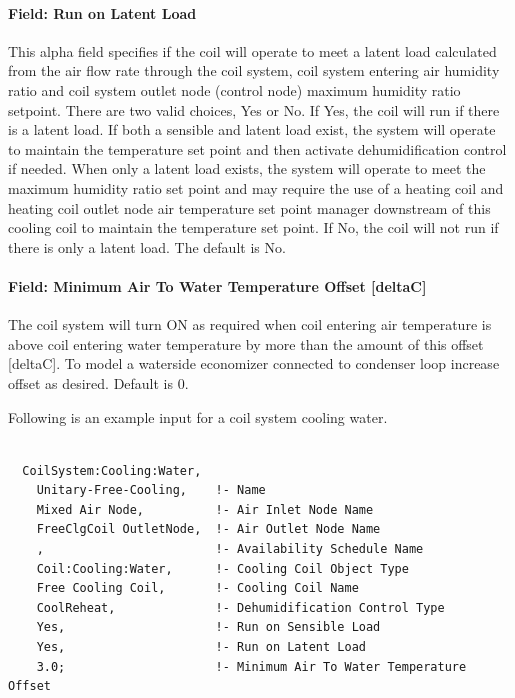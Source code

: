 \paragraph{Field: Run on Latent Load}\label{field-run-on-latent-load-01}

This alpha field specifies if the coil will operate to meet a latent load calculated from the air flow rate through the coil system, coil system entering air humidity ratio and coil system outlet node (control node) maximum humidity ratio setpoint. There are two valid choices, Yes or No. If Yes, the coil will run if there is a latent load. If both a sensible and latent load exist, the system will operate to maintain the temperature set point and then activate dehumidification control if needed. When only a latent load exists, the system will operate to meet the maximum humidity ratio set point and may require the use of a heating coil and heating coil outlet node air temperature set point manager downstream of this cooling coil to maintain the temperature set point. If No, the coil will not run if there is only a latent load. The default is No.


\paragraph{Field: Minimum Air To Water Temperature Offset [deltaC]}\label{field-minimum-air-to-water-temperature-offset}

The coil system will turn ON as required when coil entering air temperature is above coil entering water temperature by more than the amount of this offset [deltaC]. To model a waterside economizer connected to condenser loop increase offset as desired. Default is 0.


Following is an example input for a coil system cooling water.

\begin{lstlisting}

  CoilSystem:Cooling:Water,
    Unitary-Free-Cooling,    !- Name
    Mixed Air Node,          !- Air Inlet Node Name
    FreeClgCoil OutletNode,  !- Air Outlet Node Name
    ,                        !- Availability Schedule Name
    Coil:Cooling:Water,      !- Cooling Coil Object Type
    Free Cooling Coil,       !- Cooling Coil Name
    CoolReheat,              !- Dehumidification Control Type
    Yes,                     !- Run on Sensible Load
    Yes,                     !- Run on Latent Load
    3.0;                     !- Minimum Air To Water Temperature Offset
	
\end{lstlisting}


